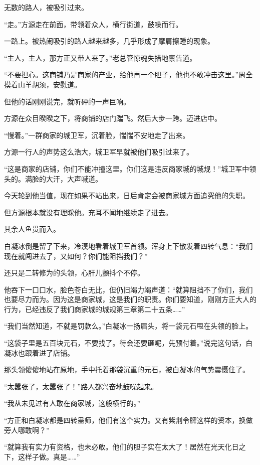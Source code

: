 \begin{this_body}
无数的路人，被吸引过来。

“走。”方源走在前面，带领着众人，横行街道，鼓噪而行。

一路上。被热闹吸引的路人越来越多，几乎形成了摩肩擦踵的现象。

“主人，主人，那方正又带人来了。”老总管惊魂失措地禀告道。

“不要担心。这商铺乃是商家的产业，给他再一个胆子，他也不敢冲击这里。”周全摸着山羊胡须，安慰道。

但他的话刚刚说完，就听砰的一声巨响。

方源在众目睽睽之下，将商铺的店门踹飞。然后大步一跨。迈进店中。

“慢着。”一群商家的城卫军，沉着脸，惴惴不安地走了出来。

方源一行人的声势这么浩大，城卫军早就被他们吸引过来了。

“这是商家的店铺，你们不能冲撞这里。你们这是违反商家城的城规！”城卫军中领头的。满脸的大汗，大声喊道。

今天轮到他当值，现在如果不站出来，日后肯定会被商家城方面追究他的失职。

但方源根本就没有理睬他。充耳不闻地继续走了进去。

其余人鱼贯而入。

白凝冰倒是留了下来，冷漠地看着城卫军首领。浑身上下散发着四转气息：“我们现在就闯进去了，又如何？你们能阻挡我们？”

还只是二转修为的头领，心肝儿颤抖个不停。

他吞下一口口水，脸色苍白无比，但仍旧竭力竭声道：“就算阻挡不了你们，我们也要尽力而为。因为这是商家城，这是我们的职责。你们要知道，刚刚方正大人的行为，已经违反了我们商家城的城规第三章第二十五条……”

“我们当然知道，不就是罚款么。”白凝冰一扬眉头，将一袋元石甩在头领的脸上。

“这袋子里是五百块元石，不要找了。待会还要砸呢，先预付着。”说完这句话，白凝冰也跟着进了店铺。

那头领傻傻地站在原地，手中托着那袋沉重的元石，被白凝冰的气势震慑住了。

“太嚣张了，太嚣张了！”路人都兴奋地鼓噪起来。

“我从未见过有人敢在商家城，这般横行的。”

“方正和白凝冰都是四转蛊师，他们有这个实力。又有紫荆令牌这样的资本，换做旁人哪敢啊？”

“就算我有实力有资格，也未必敢。他们的胆子实在太大了！居然在光天化日之下，这样子做。真是……”


\end{this_body}
